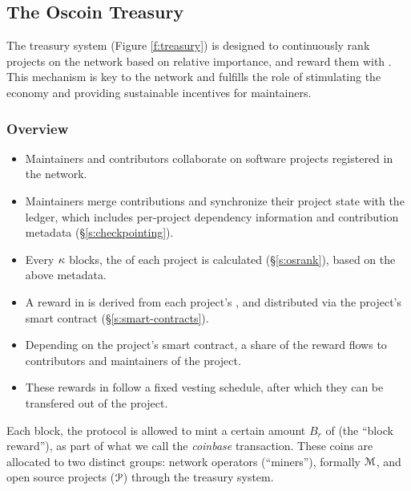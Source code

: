 \begin{figure*}[!ht]
    \par\medskip\noindent\minipage{\linewidth}
    \centering
    
    \caption{The \Oscoin{} Treasury System\label{f:treasury}}
    \endminipage\par\medskip
\end{figure*}

\subsection{The Oscoin Treasury}
\label{s:treasury}

The treasury system (Figure \ref{f:treasury}) is designed to continuously
rank projects on the network based on relative importance, and reward them with
\oscoin{}. This mechanism is key to the network and fulfills the
role of stimulating the economy and providing sustainable incentives for
maintainers.

\subsubsection{Overview}

\begin{itemize}
    \item Maintainers and contributors collaborate on software projects
        registered in the network.
    \item Maintainers merge contributions and synchronize their project state
        with the ledger, which includes per-project dependency information and
        contribution metadata (\S\ref{s:checkpointing}).
    \item Every $\kappa$ blocks, the \osrank{} of each project is calculated
        (\S\ref{s:osrank}), based on the above metadata.
    \item A reward in \oscoin{} is derived from each project's \osrank{},
        and distributed via the project's smart contract (\S\ref{s:smart-contracts}).
    \item Depending on the project's smart contract, a share of the reward flows
        to contributors and maintainers of the project.
    \item These rewards in \oscoin{} follow a fixed vesting schedule, after which
        they can be transfered out of the project.
\end{itemize}

\medskip

\noindent Each block, the protocol is allowed to mint a certain amount $B_r$ of \oscoin{}
(the ``block reward''), as part of what we call the \emph{coinbase}
transaction. These coins are allocated to two distinct groups: network
operators (``miners''), formally $\mathcal{M}$, and open source projects ($\mathcal{P}$)
through the treasury system.

